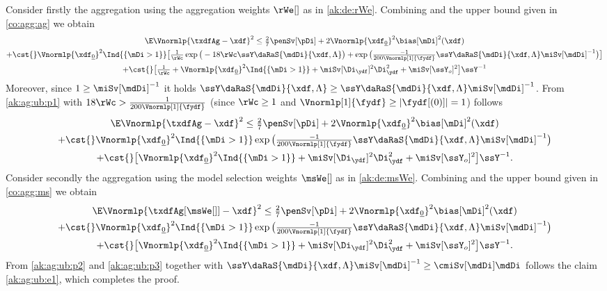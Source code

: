 \begin{pro}
  Consider firstly the aggregation using the aggregation weights
  $\rWe[]$ as in \eqref{ak:de:rWe}.  Combining
   and the upper bound given in \eqref{co:agg:ag}
  we obtain
  \begin{multline}\label{ak:ag:ub:p1}
    \E\Vnormlp{\txdfAg-\xdf}^2\leq \tfrac{2}{7}\penSv[\pDi]
    +2\Vnormlp{\xdf_{\underline{0}}}^2\bias[\mDi]^2(\xdf)
    \\\hfill
 + \cst{}\Vnormlp{\xdf_{\underline{0}}}^2\Ind{\{\mDi>1\}}\big[ \tfrac{1}{\rWc}
     \exp\big(-18\rWc\ssY\daRaS{\mdDi}{\xdf,\Lambda}\big)+
 \exp\big(\tfrac{-1}{200\Vnormlp[1]{\fydf}}\ssY\daRaS{\mdDi}{\xdf,\Lambda}\miSv[\mdDi]^{-1}\big)\big]
 \\
 +\cst{}\big[\tfrac{1}{\rWc}+
 \Vnormlp{\xdf_{\underline{0}}}^2\Ind{\{\mDi>1\}}
+\miSv[\Di_{\ydf}]^2\Di_{\ydf}^2+\miSv[\ssY_{o}]^2 \big]\ssY^{-1}
  \end{multline}
 Moreover, since $1\geq\miSv[\mdDi]^{-1}$  it holds
$\ssY\daRaS{\mdDi}{\xdf,\Lambda}\geq\ssY\daRaS{\mdDi}{\xdf,\Lambda}\miSv[\mdDi]^{-1}$. From
\eqref{ak:ag:ub:p1} with $18\rWc>\tfrac{1}{200\Vnormlp[1]{\fydf}}$
(since $\rWc\geq1$ and $\Vnormlp[1]{\fydf}\geq\vert\fydf[(0)]\vert=1$) follows
  \begin{multline}\label{ak:ag:ub:p2}
    \E\Vnormlp{\txdfAg-\xdf}^2\leq \tfrac{2}{7}\penSv[\pDi]
    +2\Vnormlp{\xdf_{\underline{0}}}^2\bias[\mDi]^2(\xdf)
    \\\hfill
 + \cst{}\Vnormlp{\xdf_{\underline{0}}}^2\Ind{\{\mDi>1\}}
 \exp\big(\tfrac{-1}{200\Vnormlp[1]{\fydf}}\ssY\daRaS{\mdDi}{\xdf,\Lambda}\miSv[\mdDi]^{-1}\big)
 \\
 +\cst{}\big[
 \Vnormlp{\xdf_{\underline{0}}}^2\Ind{\{\mDi>1\}}
+\miSv[\Di_{\ydf}]^2\Di_{\ydf}^2+\miSv[\ssY_{o}]^2 \big]\ssY^{-1}.
  \end{multline}
  Consider secondly the aggregation using the model selection weights $\msWe[]$
  as in \eqref{ak:de:msWe}. Combining
   and the upper bound given in \eqref{co:agg:ms}
  we obtain
  \begin{multline}\label{ak:ag:ub:p3}
    \E\Vnormlp{\txdfAg[{\msWe[]}]-\xdf}^2\leq \tfrac{2}{7}\penSv[\pDi]
    +2\Vnormlp{\xdf_{\underline{0}}}^2\bias[\mDi]^2(\xdf)
    \\\hfill
 + \cst{}\Vnormlp{\xdf_{\underline{0}}}^2\Ind{\{\mDi>1\}}
 \exp\big(\tfrac{-1}{200\Vnormlp[1]{\fydf}}\ssY\daRaS{\mdDi}{\xdf,\Lambda}\miSv[\mdDi]^{-1}\big)
 \\
 +\cst{}\big[
 \Vnormlp{\xdf_{\underline{0}}}^2\Ind{\{\mDi>1\}}
+\miSv[\Di_{\ydf}]^2\Di_{\ydf}^2+\miSv[\ssY_{o}]^2 \big]\ssY^{-1}.
  \end{multline}  
From \eqref{ak:ag:ub:p2} and \eqref{ak:ag:ub:p3} together with
$\ssY\daRaS{\mdDi}{\xdf,\Lambda}\miSv[\mdDi]^{-1}\geq\cmiSv[\mdDi]\mdDi$
follows the claim \eqref{ak:ag:ub:e1}, which  completes the proof.
\proEnd\end{pro}
